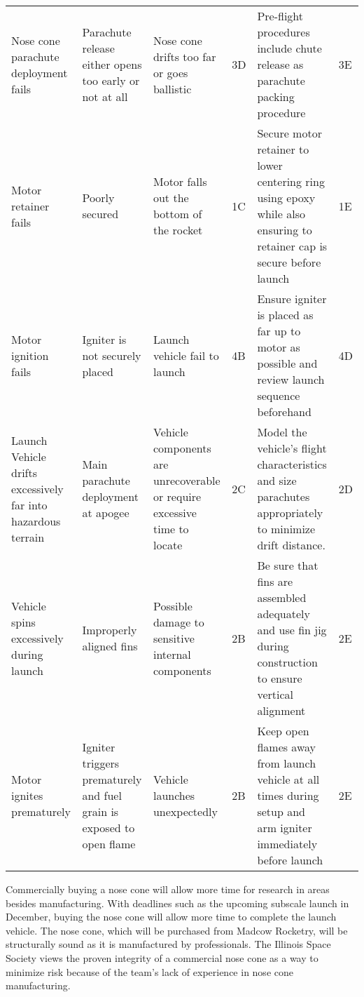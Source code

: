 \begin{table}[]
{\begin{tabularx}{\linewidth}{XXXlXl}
    Nose cone parachute deployment fails & Parachute release either opens too early or not at all & Nose cone drifts too far or goes ballistic & \cellcolor{green!25} 3D & Pre-flight procedures include chute release as parachute packing procedure & \cellcolor{green!25} 3E \\
    Motor retainer fails & Poorly secured & Motor falls out the bottom of the rocket & \cellcolor{red!25} 1C & Secure motor retainer to lower centering ring using epoxy while also ensuring to retainer cap is secure before launch & \cellcolor{green!25} 1E \\
    Motor ignition fails & Igniter is not securely placed & Launch vehicle fail to launch & \cellcolor{green!25} 4B & Ensure igniter is placed as far up to motor as possible and review launch sequence beforehand & 4D \\
    Launch Vehicle drifts excessively far into hazardous terrain & Main parachute deployment at apogee & Vehicle components are unrecoverable or require excessive time to locate & \cellcolor{orange!25} 2C & Model the vehicle’s flight characteristics and size parachutes appropriately to minimize drift distance. & \cellcolor{orange!25} 2D \\
    Vehicle spins excessively during launch & Improperly aligned fins & Possible damage to sensitive internal components & \cellcolor{red!25} 2B & Be sure that fins are assembled adequately and use fin jig during construction to ensure vertical alignment & \cellcolor{green!25} 2E \\
    Motor ignites prematurely & Igniter triggers prematurely and fuel grain is exposed to open flame & Vehicle launches unexpectedly & \cellcolor{red!25} 2B & Keep open flames away from launch vehicle at all times during setup and arm igniter immediately before launch & \cellcolor{green!25} 2E\\
    \bottomrule
    \end{tabularx}
    }
\end{table}

Commercially buying a nose cone will allow more time for research in areas besides manufacturing. With deadlines such as the upcoming subscale launch in December, buying the nose cone will allow more time to complete the launch vehicle. The nose cone, which will be purchased from Madcow Rocketry, will be structurally sound as it is manufactured by professionals. The Illinois Space Society views the proven integrity of a commercial nose cone as a way to minimize risk because of the team’s lack of experience in nose cone manufacturing.
 
